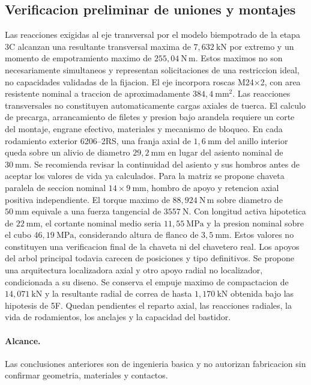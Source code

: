 \subsection{Verificacion preliminar de uniones y montajes}
Las reacciones exigidas al eje transversal por el modelo biempotrado de la etapa 3C alcanzan una resultante transversal maxima de $7{,}632\ \mathrm{kN}$ por extremo y un momento de empotramiento maximo de $255{,}04\ \mathrm{N\,m}$. Estos maximos no son necesariamente simultaneos y representan solicitaciones de una restriccion ideal, no capacidades validadas de la fijacion.
El eje incorpora roscas M24$\times$2, con area resistente nominal a traccion de aproximadamente $384{,}4\ \mathrm{mm^2}$. Las reacciones transversales no constituyen automaticamente cargas axiales de tuerca. El calculo de precarga, arrancamiento de filetes y presion bajo arandela requiere un corte del montaje, engrane efectivo, materiales y mecanismo de bloqueo.
En cada rodamiento exterior 6206--2RS, una franja axial de $1{,}6\ \mathrm{mm}$ del anillo interior queda sobre un alivio de diametro $29{,}2\ \mathrm{mm}$ en lugar del asiento nominal de $30\ \mathrm{mm}$. Se recomienda revisar la continuidad del asiento y sus hombros antes de aceptar los valores de vida ya calculados.
Para la matriz se propone chaveta paralela de seccion nominal $14\times9\ \mathrm{mm}$, hombro de apoyo y retencion axial positiva independiente. El torque maximo de $88{,}924\ \mathrm{N\,m}$ sobre diametro de $50\ \mathrm{mm}$ equivale a una fuerza tangencial de $3557\ \mathrm{N}$. Con longitud activa hipotetica de $22\ \mathrm{mm}$, el cortante nominal medio seria $11{,}55\ \mathrm{MPa}$ y la presion nominal sobre el cubo $46{,}19\ \mathrm{MPa}$, considerando altura de flanco de $3{,}5\ \mathrm{mm}$. Estos valores no constituyen una verificacion final de la chaveta ni del chavetero real.
Los apoyos del arbol principal todavia carecen de posiciones y tipo definitivos. Se propone una arquitectura localizadora axial y otro apoyo radial no localizador, condicionada a su diseno. Se conserva el empuje maximo de compactacion de $14{,}071\ \mathrm{kN}$ y la resultante radial de correa de hasta $1{,}170\ \mathrm{kN}$ obtenida bajo las hipotesis de 5F. Quedan pendientes el reparto axial, las reacciones radiales, la vida de rodamientos, los anclajes y la capacidad del bastidor.
\paragraph{Alcance.} Las conclusiones anteriores son de ingenieria basica y no autorizan fabricacion sin confirmar geometria, materiales y contactos.